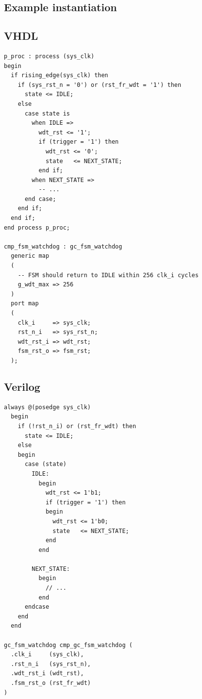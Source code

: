 \documentclass[a4paper,11pt]{article}
\begin{document}
\pagebreak
\begin{appendices}

\section{Example instantiation}
\label{app:instantiation}

\subsection{VHDL}

\begin{verbatim}
p_proc : process (sys_clk)
begin
  if rising_edge(sys_clk) then
    if (sys_rst_n = '0') or (rst_fr_wdt = '1') then
      state <= IDLE;
    else
      case state is
        when IDLE =>
          wdt_rst <= '1';
          if (trigger = '1') then
            wdt_rst <= '0';
            state   <= NEXT_STATE;
          end if;
        when NEXT_STATE =>
          -- ...
      end case;
    end if;
  end if;
end process p_proc;

cmp_fsm_watchdog : gc_fsm_watchdog
  generic map
  (
    -- FSM should return to IDLE within 256 clk_i cycles
    g_wdt_max => 256
  )
  port map
  (
    clk_i     => sys_clk;
    rst_n_i   => sys_rst_n;
    wdt_rst_i => wdt_rst;
    fsm_rst_o => fsm_rst;
  );
\end{verbatim}

\pagebreak
\subsection{Verilog}

\begin{verbatim}
always @(posedge sys_clk)
  begin
    if (!rst_n_i) or (rst_fr_wdt) then
      state <= IDLE;
    else
    begin
      case (state)
        IDLE:
          begin
            wdt_rst <= 1'b1;
            if (trigger = '1') then
            begin
              wdt_rst <= 1'b0;
              state   <= NEXT_STATE;
            end
          end
          
        NEXT_STATE:
          begin
            // ...
          end
      endcase
    end
  end
  
gc_fsm_watchdog cmp_gc_fsm_watchdog (
  .clk_i     (sys_clk),
  .rst_n_i   (sys_rst_n),
  .wdt_rst_i (wdt_rst),
  .fsm_rst_o (rst_fr_wdt)
)
\end{verbatim}

\end{appendices}


%
%
\end{document}
